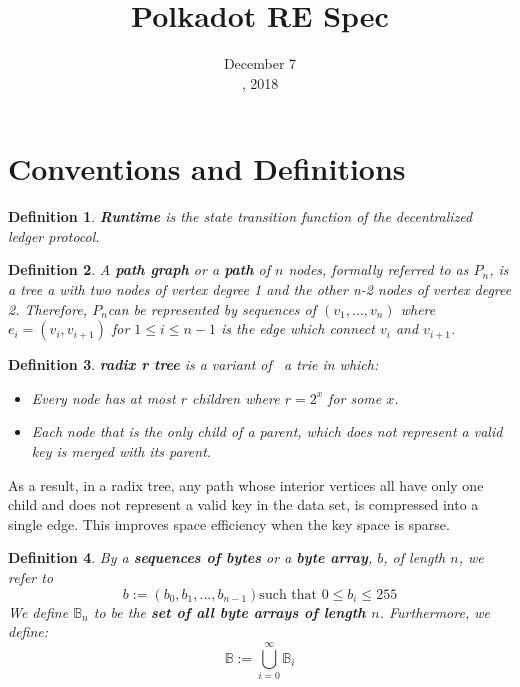 \documentclass{article}
\newcommand{\assign}{:=}
\newcommand{\tmstrong}[1]{\textbf{#1}}
\newcommand{\tmtextbf}[1]{{\bfseries{#1}}}
\newtheorem{definition}{Definition}
\providecommand{\tmstrong}[1]{\tmtextbf{#1}}
\providecommand{\tmtextbf}[1]{\tmtextbf{#1}}
\newtheorem{definition}{Definition}
\begin{document}
\title{Polkadot RE Spec}

\date{December 7\\
, 2018}

\maketitle

\section{Conventions and Definitions}

\begin{definition}
  {\tmstrong{Runtime}} is the state transition function of the decentralized
  ledger protocol.
\end{definition}

\begin{definition}
  \label{def-path-graph}A {\tmstrong{path graph}} or a {\tmstrong{path}} of
  $n$ nodes, formally referred to as {\tmstrong{$P_n$}}, is a tree a with two
  nodes of vertex degree 1 and the other n-2 nodes of vertex degree 2.
  Therefore, $P_n$can be represented by sequences of $(v_1, \ldots, v_n)$
  where $e_i = (v_i, v_{i + 1})$ for $1 \leqslant i \leqslant n - 1$ is the
  edge which connect $v_i$ and $v_{i + 1}$.
\end{definition}

\begin{definition}
  \label{def-radix-tree}{\tmstrong{radix r tree}} is a variant of \ a trie in
  which:
  \begin{itemize}
    \item Every node has at most $r$ children where $r = 2^x$ for some $x$.
    
    \item Each node that is the only child of a parent, which does not
    represent a valid key is merged with its parent.
  \end{itemize}
\end{definition}

As a result, in a radix tree, any path whose interior vertices all have only
one child and does not represent a valid key in the data set, is compressed
into a single edge. This improves space efficiency when the key space is
sparse.

\begin{definition}
  By a {\tmstrong{sequences of bytes}} or a {\tmstrong{byte array}}, $b$, of
  length $n$, we refer to
  \[ b \assign (b_0, b_1, ..., b_{n - 1})  \text{such that } 0 \leqslant b_i
     \leqslant 255 \]
  We define $\mathbb{B}_n$ to be the {\tmstrong{set of all byte arrays of
  length $n$}}. Furthermore, we define:
  \[ \mathbb{B} \assign \bigcup^{\infty}_{i = 0} \mathbb{B}_i \]
\end{definition}
\end{document}
